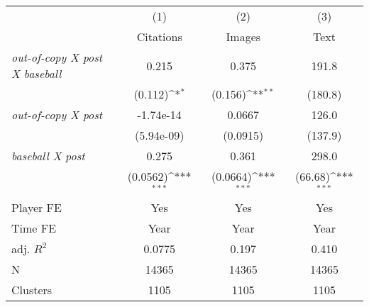 {
\def\sym#1{\ifmmode^{#1}\else\(^{#1}\)\fi}
\begin{tabular*}{\hsize}{@{\hskip\tabcolsep\extracolsep\fill}l*{3}{c}}
\toprule
            &\multicolumn{1}{c}{(1)}&\multicolumn{1}{c}{(2)}&\multicolumn{1}{c}{(3)}\\
            &\multicolumn{1}{c}{Citations}&\multicolumn{1}{c}{Images}&\multicolumn{1}{c}{Text}\\
\midrule
\emph{out-of-copy X post X baseball}&       0.215         &       0.375         &       191.8         \\
            &     (0.112)\sym{*}  &     (0.156)\sym{**} &     (180.8)         \\
\addlinespace
\emph{out-of-copy X post}&   -1.74e-14         &      0.0667         &       126.0         \\
            &  (5.94e-09)         &    (0.0915)         &     (137.9)         \\
\addlinespace
\emph{baseball X post}&       0.275         &       0.361         &       298.0         \\
            &    (0.0562)\sym{***}&    (0.0664)\sym{***}&     (66.68)\sym{***}\\
\midrule
Player FE   &         Yes         &         Yes         &         Yes         \\
Time FE     &        Year         &        Year         &        Year         \\
adj. $R^2$  &      0.0775         &       0.197         &       0.410         \\
N           &       14365         &       14365         &       14365         \\
Clusters    &        1105         &        1105         &        1105         \\
\bottomrule
\end{tabular*}
}
